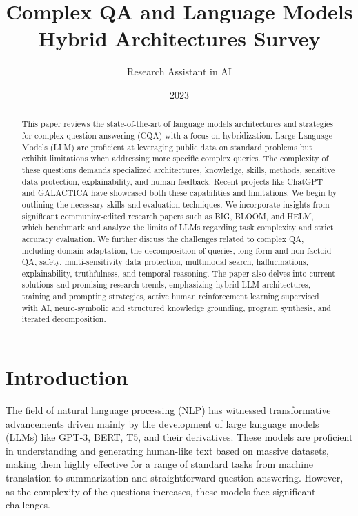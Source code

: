 \documentclass[12pt]{article}
\title{Complex QA and Language Models Hybrid Architectures Survey}
\author{Research Assistant in AI}
\date{2023}
\begin{document}
\maketitle

\begin{abstract}
This paper reviews the state-of-the-art of language models architectures and strategies for complex question-answering (CQA) with a focus on hybridization. Large Language Models (LLM) are proficient at leveraging public data on standard problems but exhibit limitations when addressing more specific complex queries. The complexity of these questions demands specialized architectures, knowledge, skills, methods, sensitive data protection, explainability, and human feedback. Recent projects like ChatGPT and GALACTICA have showcased both these capabilities and limitations. We begin by outlining the necessary skills and evaluation techniques. We incorporate insights from significant community-edited research papers such as BIG, BLOOM, and HELM, which benchmark and analyze the limits of LLMs regarding task complexity and strict accuracy evaluation. We further discuss the challenges related to complex QA, including domain adaptation, the decomposition of queries, long-form and non-factoid QA, safety, multi-sensitivity data protection, multimodal search, hallucinations, explainability, truthfulness, and temporal reasoning. The paper also delves into current solutions and promising research trends, emphasizing hybrid LLM architectures, training and prompting strategies, active human reinforcement learning supervised with AI, neuro-symbolic and structured knowledge grounding, program synthesis, and iterated decomposition.
\end{abstract}

\tableofcontents

\newpage

\section{Introduction}
The field of natural language processing (NLP) has witnessed transformative advancements driven mainly by the development of large language models (LLMs) like GPT-3, BERT, T5, and their derivatives. These models are proficient in understanding and generating human-like text based on massive datasets, making them highly effective for a range of standard tasks from machine translation to summarization and straightforward question answering. However, as the complexity of the questions increases, these models face significant challenges.
\end{document}
